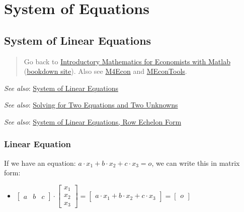 \documentclass[
]{book}
\providecommand{\tightlist}{%
  \setlength{\itemsep}{0pt}\setlength{\parskip}{0pt}}
\begin{document}
\hypertarget{system-of-equations}{%
\chapter{System of Equations}\label{system-of-equations}}

\hypertarget{system-of-linear-equations}{%
\section{System of Linear Equations}\label{system-of-linear-equations}}

\begin{quote}
Go back to \href{https://math4econ.github.io/}{Introductory Mathematics for Economists with Matlab} (\href{https://math4econ.github.io/bookdown}{bookdown site}). Also see \href{http://fanwangecon.github.io/M4Econ}{M4Econ} and \href{https://fanwangecon.github.io/MEconTools/}{MEconTools}.
\end{quote}

\emph{See also}: \href{https://math4econ.github.io/matrix_system_of_equations/matrix_linear_equations.html}{System of Linear
Equations}

\emph{See also}: \href{https://math4econ.github.io/matrix_system_of_equations/matrix_linear_system_2.html}{Solving for Two Equations and Two
Unknowns}

\emph{See also}: \href{https://math4econ.github.io/matrix_system_of_equations/matrix_row_echelon_form.html}{System of Linear Equations, Row Echelon
Form}

\hypertarget{linear-equation}{%
\subsection{Linear Equation}\label{linear-equation}}

If we have an equation: \(a\cdot x_1 +b\cdot x_2 +c\cdot x_3 =o\), we can
write this in matrix form:

\begin{itemize}
\tightlist
\item
  \(\displaystyle \left\lbrack \begin{array}{ccc} a & b & c \end{array}\right\rbrack \cdot \left\lbrack \begin{array}{c} x_1 \\ x_2 \\ x_3 \end{array}\right\rbrack =\left\lbrack \begin{array}{cc} a\cdot x_1 +b\cdot x_2 +c\cdot x_3 \end{array}\right\rbrack =\left\lbrack \begin{array}{c} o \end{array}\right\rbrack\)
\end{itemize}
\end{document}
